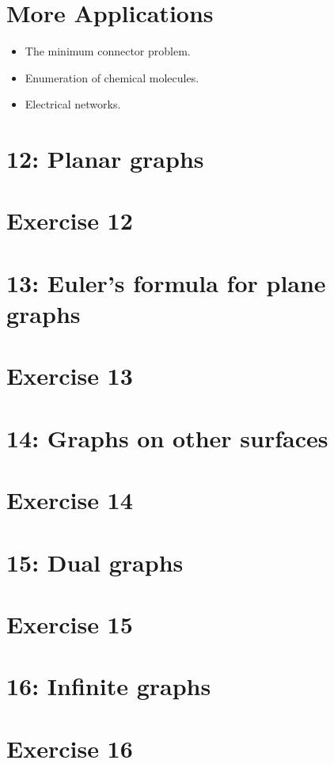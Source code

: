\documentclass[12pt,a4paper, twocolumn]{article}
\begin{document}
\section*{More Applications}
\begin{itemize}
	\item The minimum connector problem.
	\item Enumeration of chemical molecules.
	\item Electrical networks.
\end{itemize}

\section*{12: Planar graphs}

\section*{Exercise 12}

\section*{13: Euler's formula for plane graphs}

\section*{Exercise 13}

\section*{14: Graphs on other surfaces}

\section*{Exercise 14}

\section*{15: Dual graphs}

\section*{Exercise 15}

\section*{16: Infinite graphs}

\section*{Exercise 16}
\end{document}
